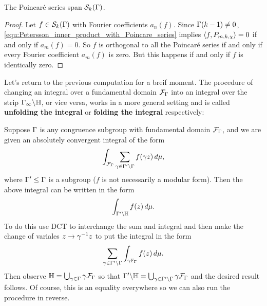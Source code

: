       \begin{theorem}
        The Poincar\'e series span $\mathcal{S}_{k}(\Gamma)$.
      \end{theorem}
      \begin{proof}
        Let $f \in \mathcal{S}_{k}(\Gamma)$ with Fourier coefficients $a_{n}(f)$. Since $\Gamma(k-1) \neq 0$, \cref{equ:Petersson_inner_product_with_Poincare_series} implies $\langle f,P_{m,k,\chi}\rangle = 0$ if and only if $a_{m}(f) = 0$. So $f$ is orthogonal to all the Poincar\'e series if and only if every Fourier coefficient $a_{m}(f)$ is zero. But this happens if and only if $f$ is identically zero.
      \end{proof}

      Let's return to the previous computation for a breif moment. The procedure of changing an integral over a fundamental domain $\mathcal{F}_{\Gamma}$ into an integral over the strip $\Gamma_{\infty}\backslash\mathbb{H}$, or vice versa, works in a more general setting and is called \textbf{unfolding the integral} or \textbf{folding the integral} respectively:

      \begin{method}
        Suppose $\Gamma$ is any congruence subgroup with fundamental domain $\mathcal{F}_{\Gamma}$, and we are given an absolutely convergent integral of the form
        \[
          \int_{\mathcal{F}_{\Gamma}}\sum_{\gamma \in \Gamma'\backslash\Gamma}f(\gamma z)\,d\mu,
        \]
        where $\Gamma' \le \Gamma$ is a subgroup ($f$ is not necessarily a modular form). Then the above integral can be written in the form
        \[
          \int_{\Gamma'\backslash\mathbb{H}}f(z)\,d\mu.
        \]
        To do this use DCT to interchange the sum and integral and then make the change of variales $z \to \gamma^{-1}z$ to put the integral in the form
        \[
          \sum_{\gamma \in \Gamma'\backslash\Gamma}\int_{\gamma\mathbb{F}_{\Gamma}}f(z)\,d\mu.
        \]
        Then observe $\mathbb{H} = \bigcup_{\gamma \in \Gamma}\gamma\mathcal{F}_{\Gamma}$ so that $\Gamma'\backslash\mathbb{H} = \bigcup_{\gamma \in \Gamma'\backslash\Gamma}\gamma\mathcal{F}_{\Gamma}$ and the desired result follows. Of course, this is an equality everywhere so we can also run the procedure in reverse.
      \end{method}
